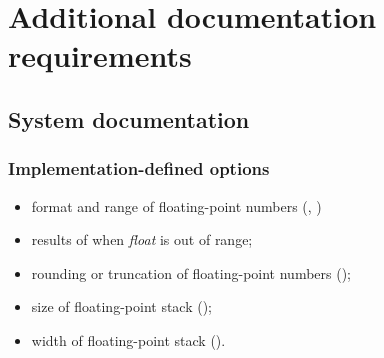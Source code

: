 \section{Additional documentation requirements} %

\subsection{System documentation} %

\subsubsection{Implementation-defined options} %
\begin{itemize}
\item format and range of floating-point numbers
	(,
	 )
\item results of  when
	\emph{float} is out of range;
\item rounding or truncation of floating-point numbers
	();
\item size of floating-point stack
	();
\item width of floating-point stack
	().
\end{itemize}

